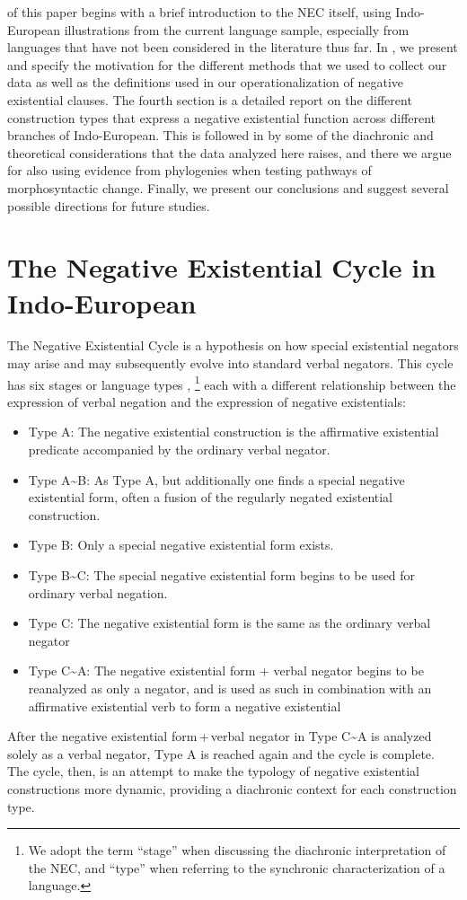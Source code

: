 \documentclass[output=paper,colorlinks,citecolor=brown]{langscibook}
\begin{document}
 of this paper begins with a brief introduction to the
NEC itself, using Indo-European illustrations from the current language
sample, especially from languages that have not been considered in the
literature thus far. In , we present and specify the
motivation for the different methods that we used to collect our data as
well as the definitions used in our operationalization of negative
existential clauses. The fourth section is a detailed report on the
different construction types that express a negative existential function
across different branches of Indo-European. This is followed in
 by some of the diachronic and theoretical
considerations that the data analyzed here raises, and there we argue for
also using evidence from phylogenies when testing pathways of
morphosyntactic change. Finally, we present our conclusions and suggest
several possible directions for future studies.

\section{The Negative Existential Cycle in Indo-European}\label{sec:ieur-2}

The Negative Existential Cycle \citep{Croft1991} is a hypothesis on how
special existential negators may arise and may subsequently evolve into
standard verbal negators. This cycle has six stages \citep{Veselinova2014}
or language types \citep{Croft1991},%
%
    \footnote{We adopt the term ``stage'' when
    discussing the diachronic interpretation of the NEC, and ``type'' when
    referring to the synchronic characterization of a language.}
%
each with a
different relationship between the expression of verbal negation and the
expression of negative existentials:
%
\begin{itemize}
\item Type A: The negative existential construction is the affirmative existential predicate accompanied by the ordinary verbal negator.
\item Type A{\textasciitilde}B: As Type A, but additionally one finds a special negative existential form, often a fusion of the regularly negated existential construction.
\item Type B: Only a special negative existential form exists.
\item Type B{\textasciitilde}C: The special negative existential form begins to be used for ordinary verbal negation.
\item Type C: The negative existential form is the same as the ordinary verbal negator
\item Type C{\textasciitilde}A: The negative existential form + verbal negator begins to be reanalyzed as only a negator, and is used as such in combination with an affirmative existential verb to form a negative existential
\end{itemize}
%
After the negative existential form\,+\,verbal negator in Type C{\textasciitilde}A is analyzed solely as a verbal negator, Type A is reached again and the cycle is complete. The cycle, then, is an attempt to make the typology of negative existential constructions more dynamic, providing a diachronic context for each construction type.
\end{document}

